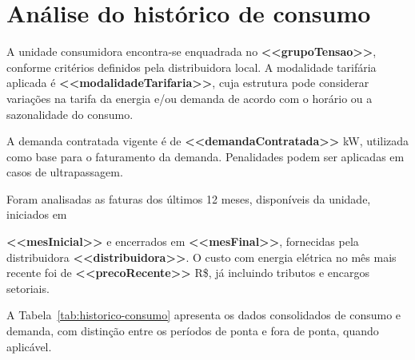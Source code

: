 \chapter{Análise do histórico de consumo}

A unidade consumidora encontra-se enquadrada no \textbf{<<grupoTensao>>}, conforme critérios definidos pela distribuidora local. A modalidade tarifária aplicada é \textbf{<<modalidadeTarifaria>>}, cuja estrutura pode considerar variações na tarifa da energia e/ou demanda de acordo com o horário ou a sazonalidade do consumo.

A demanda contratada vigente é de \textbf{<<demandaContratada>>} kW, utilizada como base para o faturamento da demanda. Penalidades podem ser aplicadas em casos de ultrapassagem.

Foram analisadas as faturas dos últimos 12 meses, disponíveis da unidade, iniciados em {\textbf{<<mesInicial>>} e encerrados em \textbf{<<mesFinal>>}, fornecidas pela distribuidora \textbf{<<distribuidora>>}. O custo com energia elétrica no mês mais recente foi de \textbf{<<precoRecente>>} R\$, já incluindo tributos e encargos setoriais.

A Tabela~\ref{tab:historico-consumo} apresenta os dados consolidados de consumo e demanda, com distinção entre os períodos de ponta e fora de ponta, quando aplicável.



\vspace{1cm}


}
